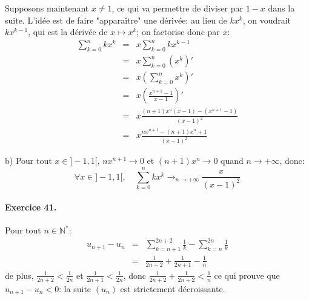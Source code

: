 Supposons maintenant $x\neq 1$, ce qui va permettre de diviser par $1-x$ dans la suite. L’idée est de faire "apparaître" une dérivée: au lieu de $kx^k$, on voudrait $kx^{k-1}$, qui est la dérivée de $x\mapsto x^{k}$; on factorise donc par $x$:
\begin{eqnarray}
\sum_{k=0}^n{kx^k} &=& x\sum_{k=0}^n{kx^{k-1}} \nonumber \\
 &=& x\sum_{k=0}^n{\left( x^k \right)'} \nonumber \\
  &=& x \left( \sum_{k=0}^n{ x^k }\right)' \nonumber \\
  &=& x \left( \frac{x^{n+1}-1}{x-1} \right)' \nonumber \\
  &=& x \frac{(n+1)x^n(x-1)-(x^{n+1}-1)}{(x-1)^2} \nonumber \\
  &=& x \frac{nx^{n+1}-(n+1)x^n+1}{(x-1)^2} \nonumber
\end{eqnarray}

b) Pour tout $x\in ]-1,1[$, $nx^{n+1}\to 0$ et $(n+1)x^n\to 0$ quand $n\to+\infty$, donc:
\[
\forall x\in ]-1,1[, \quad \sum_{k=0}^n{kx^k} \mathop{\to}_{n\to +\infty} \frac{x}{(x-1)^2}
\]

\paragraph{Exercice 41.} Pour tout $n\in \mathbb{N}^*$:
\begin{eqnarray}
  u_{n+1}-u_n &=& \sum_{k=n+1}^{2n+2}{\frac{1}{k}} - \sum_{k=n}^{2n}{\frac{1}{k}} \nonumber \\
       &=& \frac{1}{2n+2} + \frac{1}{2n+1} - \frac{1}{n} \nonumber 
\end{eqnarray}
de plus, $ \frac{1}{2n+2} < \frac{1}{2n}$ et $ \frac{1}{2n+1} < \frac{1}{2n}$, donc $\frac{1}{2n+2} + \frac{1}{2n+2} < \frac{1}{n}$ ce qui prouve que $u_{n+1}-u_n<0$: la suite $(u_n)$ est strictement décroissante.
